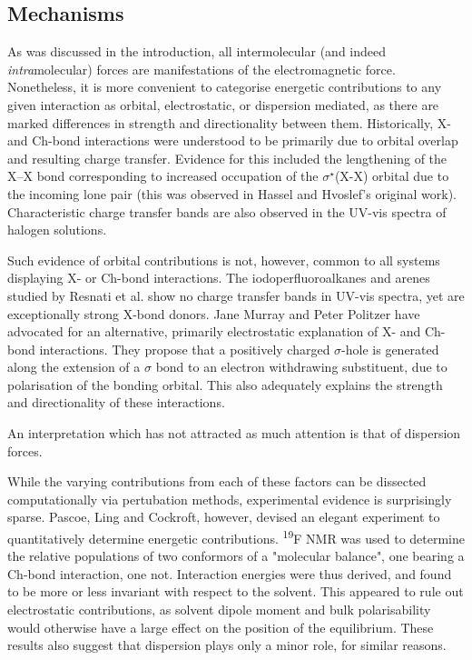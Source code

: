 \begin{refsection}
\subsection{Mechanisms}
As was discussed in the introduction, all intermolecular (and indeed \emph{intra}molecular) forces are manifestations of the electromagnetic force.
Nonetheless, it is more convenient to categorise energetic contributions to any given interaction as orbital, electrostatic, or dispersion mediated, as there are marked differences in strength and directionality between them.
Historically, X- and Ch-bond interactions were understood to be primarily due to orbital overlap and resulting charge transfer.
Evidence for this included the lengthening of the X--X bond corresponding to increased occupation of the $\sigma^{\star}$(X-X) orbital due to the incoming lone pair (this was observed in Hassel and Hvoslef's original work\autocite{Hassel1954}).
Characteristic charge transfer bands are also observed in the UV-vis spectra of halogen solutions.\autocite{Blackstock1987}

Such evidence of orbital contributions is not, however, common to all systems displaying X- or Ch-bond interactions.
The iodoperfluoroalkanes and arenes studied by Resnati et al. show no charge transfer bands in UV-vis spectra, yet are exceptionally strong X-bond donors.\autocite{Yan2014}
Jane Murray and Peter Politzer have advocated for an alternative, primarily electrostatic explanation of X- and Ch-bond interactions.\autocite{Murray2008,Murray2009}
They propose that a positively charged $\sigma$-hole is generated along the extension of a $\sigma$ bond to an electron withdrawing substituent, due to polarisation of the bonding orbital.
This also adequately explains the strength and directionality of these interactions.

An interpretation which has not attracted as much attention is that of dispersion forces.

While the varying contributions from each of these factors can be dissected computationally via pertubation methods, experimental evidence is surprisingly sparse.
Pascoe, Ling and Cockroft, however, devised an elegant experiment to quantitatively determine energetic contributions.\autocite{Pascoe2017}
\textsuperscript{19}F NMR was used to determine the relative populations of two conformors of a "molecular balance", one bearing a Ch-bond interaction, one not.
Interaction energies were thus derived, and found to be more or less invariant with respect to the solvent.
This appeared to rule out electrostatic contributions, as solvent dipole moment and bulk polarisability would otherwise have a large effect on the position of the equilibrium.
These results also suggest that dispersion plays only a minor role, for similar reasons.


\end{refsection}
